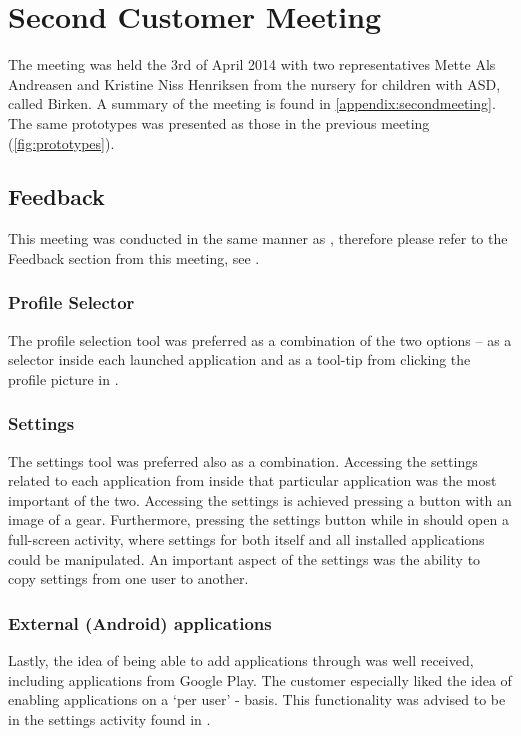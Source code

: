 \section{Second Customer Meeting}\label{sec:sprint2:secondmeeting}
The meeting was held the 3rd of April 2014 with two representatives Mette Als Andreasen and Kristine Niss Henriksen from the nursery for children with ASD, called Birken.
A summary of the meeting is found in \cref{appendix:secondmeeting}.
The same prototypes was presented as those in the previous meeting (\cref{fig:prototypes}).

\subsection{Feedback}
This meeting was conducted in the same manner as , therefore please refer to the Feedback section from this meeting, see .

\subsubsection*{Profile Selector}
The profile selection tool was preferred as a combination of the two options -- as a selector inside each launched application and as a tool-tip from clicking the profile picture in \launcher.

\subsubsection{Settings}
The settings tool was preferred also as a combination.
Accessing the settings related to each application from inside that particular application was the most important of the two. Accessing the settings is achieved pressing a button with an image of a gear.
Furthermore, pressing the settings button while in \launcher should open a full-screen activity, where settings for both \launcher itself and all installed applications could be manipulated.
An important aspect of the settings was the ability to copy settings from one user to another.

\subsubsection{External (Android) applications}
Lastly, the idea of being able to add applications through \launcher was well received, including applications from Google Play.
The customer especially liked the idea of enabling applications on a `per user' - basis.
This functionality was advised to be in the settings activity found in \launcher.

